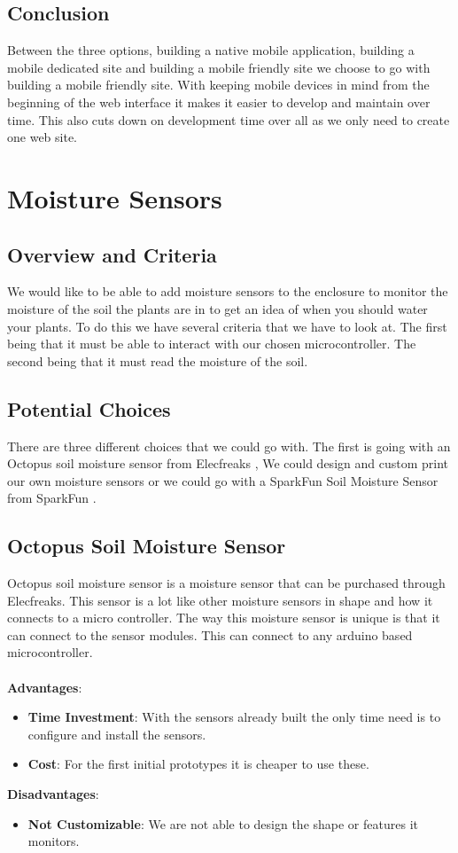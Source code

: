 	\subsection{Conclusion}
	Between the three options, building a native mobile application, building a
	mobile dedicated site and building a mobile friendly site we choose to go with
	building a mobile friendly site. With keeping mobile devices in mind from the
	beginning of the web interface it makes it easier to develop and maintain over
	time. This also cuts down on development time over all as we only need to
	create one web site.
\section{Moisture Sensors}
	\subsection{Overview and Criteria}
	We would like to be able to add moisture sensors
	to the enclosure to monitor the moisture of the soil the plants are in to
	get an idea of when you should water your plants. To do this we have several
	criteria that we have to look at. The first being that it must be able to
	interact with our chosen microcontroller. The second being that it must
	read the moisture of the soil.
	\subsection{Potential Choices }
	There are three different choices that we could go with. The first is going
	with an Octopus soil moisture sensor from Elecfreaks \cite[pg 2] {Octopus_soil_sensor},
	We could design and custom print our own moisture sensors or we could go with
	a SparkFun Soil Moisture Sensor from SparkFun \cite[pg 2] {SparkFun_Soil_Moisture_Sensor}.
	\subsection{Octopus Soil Moisture Sensor}
	Octopus soil moisture sensor is a moisture sensor that can be purchased through
	Elecfreaks. This sensor is a lot like other moisture sensors in shape and how
	it connects to a micro controller. The way this moisture sensor is unique is
	that it can connect to the sensor modules. This can connect to any arduino
	based microcontroller.
	\\\\
	\textbf{Advantages}:
	\begin{itemize}
		\item \textbf{Time Investment}: With the sensors already built the only time
		need is to configure and install the sensors.
		\item \textbf{Cost}: For the first initial prototypes it is cheaper to use
		these.
	\end{itemize}
	\noindent\textbf{Disadvantages}:
	\begin{itemize}
		\item \textbf{Not Customizable}: We are not able to design the shape or features
		it monitors.
	\end{itemize}
